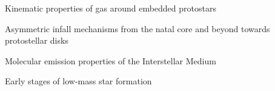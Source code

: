 \vspace{8pt}
\begin{cvitems} %
      \item{Kinematic properties of gas around embedded protostars}
       \item {Asymmetric infall mechanisms from the natal core and beyond towards protostellar disks}
       \item {Molecular emission properties of the Interstellar Medium}
       \item{Early stages of low-mass star formation}
\end{cvitems}
\vspace{8pt}